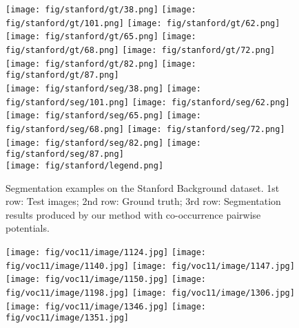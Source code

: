 \documentclass[10pt,3p]{elsarticle}
\begin{document}
\begin{figure}[!t]
	\texttt{[image: fig/stanford/gt/38.png]}
     \texttt{[image: fig/stanford/gt/101.png]}     
	\texttt{[image: fig/stanford/gt/62.png]}
	\texttt{[image: fig/stanford/gt/65.png]}
     \texttt{[image: fig/stanford/gt/68.png]}
     \texttt{[image: fig/stanford/gt/72.png]}   
     \texttt{[image: fig/stanford/gt/82.png]} 
     \texttt{[image: fig/stanford/gt/87.png]}\\
 
       
     \texttt{[image: fig/stanford/seg/38.png]}
     \texttt{[image: fig/stanford/seg/101.png]}     
	\texttt{[image: fig/stanford/seg/62.png]}
    \texttt{[image: fig/stanford/seg/65.png]}
     \texttt{[image: fig/stanford/seg/68.png]}
     \texttt{[image: fig/stanford/seg/72.png]}   
     \texttt{[image: fig/stanford/seg/82.png]} 
     \texttt{[image: fig/stanford/seg/87.png]}\\

     \texttt{[image: fig/stanford/legend.png]}

\caption{Segmentation examples on the Stanford Background dataset. 1st row: Test images; 2nd row: Ground truth; 
3rd row: Segmentation results produced by our method with co-occurrence pairwise potentials. }
    \label{fig:seg_stanford}      
\end{figure}\begin{figure}[!t]
\centering
	\texttt{[image: fig/voc11/image/1124.jpg]}
     \texttt{[image: fig/voc11/image/1140.jpg]}     
	\texttt{[image: fig/voc11/image/1147.jpg]}
    \texttt{[image: fig/voc11/image/1150.jpg]}
     \texttt{[image: fig/voc11/image/1198.jpg]}
     \texttt{[image: fig/voc11/image/1306.jpg]}   
     \texttt{[image: fig/voc11/image/1346.jpg]} 
     \texttt{[image: fig/voc11/image/1351.jpg]}\\
     

\end{figure}
\end{document}
